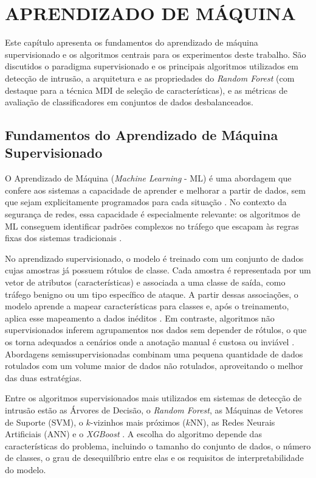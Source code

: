 \chapter{APRENDIZADO DE MÁQUINA}

Este capítulo apresenta os fundamentos do aprendizado de máquina supervisionado e os algoritmos centrais para os experimentos deste trabalho. São discutidos o paradigma supervisionado e os principais algoritmos utilizados em detecção de intrusão, a arquitetura e as propriedades do \textit{Random Forest} (com destaque para a técnica MDI de seleção de características), e as métricas de avaliação de classificadores em conjuntos de dados desbalanceados.

\section{Fundamentos do Aprendizado de Máquina Supervisionado}

O Aprendizado de Máquina (\textit{Machine Learning} - ML) é uma abordagem que confere aos sistemas a capacidade de aprender e melhorar a partir de dados, sem que sejam explicitamente programados para cada situação \cite{sbrc_minicursos}. No contexto da segurança de redes, essa capacidade é especialmente relevante: os algoritmos de ML conseguem identificar padrões complexos no tráfego que escapam às regras fixas dos sistemas tradicionais \cite{santos2023ercemapi}.

No aprendizado supervisionado, o modelo é treinado com um conjunto de dados cujas amostras já possuem rótulos de classe. Cada amostra é representada por um vetor de atributos (características) e associada a uma classe de saída, como tráfego benigno ou um tipo específico de ataque. A partir dessas associações, o modelo aprende a mapear características para classes e, após o treinamento, aplica esse mapeamento a dados inéditos \cite{sbrc_minicursos}. Em contraste, algoritmos não supervisionados inferem agrupamentos nos dados sem depender de rótulos, o que os torna adequados a cenários onde a anotação manual é custosa ou inviável \cite{santos2023ercemapi}. Abordagens semissupervisionadas combinam uma pequena quantidade de dados rotulados com um volume maior de dados não rotulados, aproveitando o melhor das duas estratégias.

Entre os algoritmos supervisionados mais utilizados em sistemas de detecção de intrusão estão as Árvores de Decisão, o \textit{Random Forest}, as Máquinas de Vetores de Suporte (SVM), o $k$-vizinhos mais próximos ($k$NN), as Redes Neurais Artificiais (ANN) e o \textit{XGBoost} \cite{santos2023ercemapi}. A escolha do algoritmo depende das características do problema, incluindo o tamanho do conjunto de dados, o número de classes, o grau de desequilíbrio entre elas e os requisitos de interpretabilidade do modelo.


